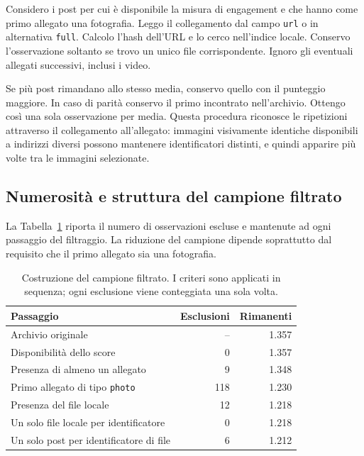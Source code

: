 Considero i post per cui è disponibile la misura di engagement e che hanno come primo allegato una fotografia. Leggo il collegamento dal campo \texttt{url} o in alternativa \texttt{full}. Calcolo l'hash dell'URL e lo cerco nell'indice locale. Conservo l'osservazione soltanto se trovo un unico file corrispondente. Ignoro gli eventuali allegati successivi, inclusi i video.

Se più post rimandano allo stesso media, conservo quello con il punteggio maggiore. In caso di parità conservo il primo incontrato nell'archivio. Ottengo così una sola osservazione per media. Questa procedura riconosce le ripetizioni attraverso il collegamento all'allegato: immagini visivamente identiche disponibili a indirizzi diversi possono mantenere identificatori distinti, e quindi apparire più volte tra le immagini selezionate.

\subsection{Numerosità e struttura del campione filtrato}
\label{subsec:dataset-campione-filtrato}

La Tabella~\ref{tab:dataset-selezione} riporta il numero di osservazioni escluse e mantenute ad ogni passaggio del filtraggio. La riduzione del campione dipende soprattutto dal requisito che il primo allegato sia una fotografia.

\begin{table}[htbp]
    \centering
    \caption{Costruzione del campione filtrato. I criteri sono applicati in sequenza; ogni esclusione viene conteggiata una sola volta.}
    \label{tab:dataset-selezione}
    \begin{tabular}{@{}p{}rr@{}}
        \toprule
        Passaggio & Esclusioni & Rimanenti \\
        \midrule
        Archivio originale & -- & 1.357 \\
        Disponibilità dello score & 0 & 1.357 \\
        Presenza di almeno un allegato & 9 & 1.348 \\
        Primo allegato di tipo \texttt{photo} & 118 & 1.230 \\
        Presenza del file locale & 12 & 1.218 \\
        Un solo file locale per identificatore & 0 & 1.218 \\
        Un solo post per identificatore di file & 6 & 1.212 \\
        \bottomrule
    \end{tabular}
\end{table}

